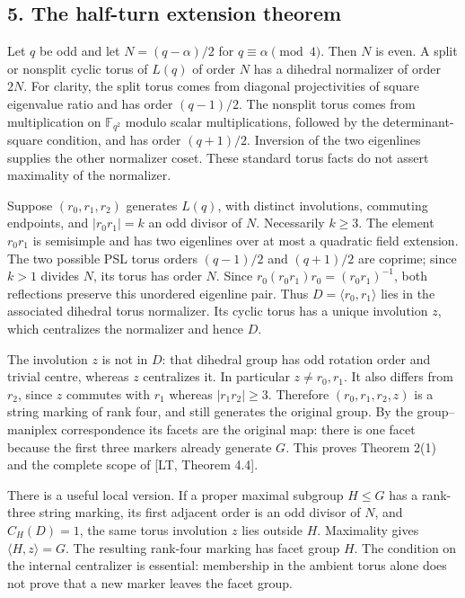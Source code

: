 \documentclass[
  11pt,
]{article}
\begin{document}
\subsection{5. The half-turn extension
theorem}\label{the-half-turn-extension-theorem}

Let \(q\) be odd and let \(N=(q-\alpha)/2\) for \(q\equiv\alpha\pmod4\).
Then \(N\) is even. A split or nonsplit cyclic torus of \(L(q)\) of
order \(N\) has a dihedral normalizer of order \(2N\). For clarity, the
split torus comes from diagonal projectivities of square eigenvalue
ratio and has order \((q-1)/2\). The nonsplit torus comes from
multiplication on \(\mathbb F_{q^2}\) modulo scalar multiplications,
followed by the determinant-square condition, and has order \((q+1)/2\).
Inversion of the two eigenlines supplies the other normalizer coset.
These standard torus facts do not assert maximality of the normalizer.

Suppose \((r_0,r_1,r_2)\) generates \(L(q)\), with distinct involutions,
commuting endpoints, and \(|r_0r_1|=k\) an odd divisor of \(N\).
Necessarily \(k\ge3\). The element \(r_0r_1\) is semisimple and has two
eigenlines over at most a quadratic field extension. The two possible
PSL torus orders \((q-1)/2\) and \((q+1)/2\) are coprime; since \(k>1\)
divides \(N\), its torus has order \(N\). Since
\(r_0(r_0r_1)r_0=(r_0r_1)^{-1}\), both reflections preserve this
unordered eigenline pair. Thus \(D=\langle r_0,r_1\rangle\) lies in the
associated dihedral torus normalizer. Its cyclic torus has a unique
involution \(z\), which centralizes the normalizer and hence \(D\).

The involution \(z\) is not in \(D\): that dihedral group has odd
rotation order and trivial centre, whereas \(z\) centralizes it. In
particular \(z\ne r_0,r_1\). It also differs from \(r_2\), since \(z\)
commutes with \(r_1\) whereas \(|r_1r_2|\ge3\). Therefore
\((r_0,r_1,r_2,z)\) is a string marking of rank four, and still
generates the original group. By the group--maniplex correspondence its
facets are the original map: there is one facet because the first three
markers already generate \(G\). This proves Theorem 2(1) and the
complete scope of {[}LT, Theorem 4.4{]}.

There is a useful local version. If a proper maximal subgroup \(H\le G\)
has a rank-three string marking, its first adjacent order is an odd
divisor of \(N\), and \(C_H(D)=1\), the same torus involution \(z\) lies
outside \(H\). Maximality gives \(\langle H,z\rangle=G\). The resulting
rank-four marking has facet group \(H\). The condition on the internal
centralizer is essential: membership in the ambient torus alone does not
prove that a new marker leaves the facet group.
\end{document}
